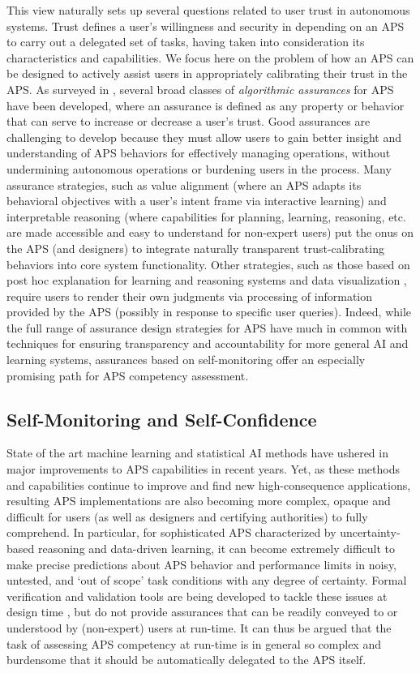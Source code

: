 This view naturally sets up several questions related to user trust in autonomous systems. Trust defines a user's willingness and security in depending on an APS to carry out a delegated set of tasks, having taken into consideration its characteristics and capabilities. 
We focus here on the problem of how an APS can be designed to actively assist users in appropriately calibrating their trust in the APS. As surveyed in \cite{Israelsen2017-ym}, several broad classes of \emph{algorithmic assurances} for APS have been developed, where an assurance is defined as any property or behavior that can serve to increase or decrease a user's trust. 
Good assurances are challenging to develop because they must allow users to gain better insight and understanding of APS behaviors for effectively managing operations, without undermining autonomous operations or burdening users in the process. 
Many assurance strategies, such as value alignment \cite{Dragan2014-gu} (where an APS adapts its behavioral objectives with a user's intent frame via interactive learning) and interpretable reasoning \cite{} (where capabilities for planning, learning, reasoning, etc. are made accessible and easy to understand for non-expert users) put the onus on the APS (and designers) to integrate naturally transparent trust-calibrating behaviors into core system functionality. 
Other strategies, such as those based on post hoc explanation for learning and reasoning systems \cite{Lacave2004-gq, ...} and data visualization \cite{}, require users to render their own judgments via processing of information provided by the APS (possibly in response to specific user queries). 
Indeed, while the full range of assurance design strategies for APS have much in common with techniques for ensuring transparency and accountability for more general AI and learning systems, assurances based on self-monitoring offer an especially promising path for APS competency assessment. 

\subsection{Self-Monitoring and Self-Confidence}
State of the art machine learning and statistical AI methods have ushered in major improvements to APS capabilities in recent years. 
Yet, as these methods and capabilities continue to improve and find new high-consequence applications, resulting APS implementations are also becoming more complex, opaque and difficult for users (as well as designers and certifying authorities) to fully comprehend. 
In particular, for sophisticated APS characterized by uncertainty-based reasoning and data-driven learning, it can become extremely difficult to make precise predictions about APS behavior and performance limits in noisy, untested, and `out of scope' task conditions with any degree of certainty. Formal verification and validation tools are being developed to tackle these issues at design time \cite{...}, but do not provide assurances that can be readily conveyed to or understood by (non-expert) users at run-time. 
It can thus be argued that the task of assessing APS competency at run-time is in general so complex and burdensome that it should be automatically delegated to the APS itself. 

